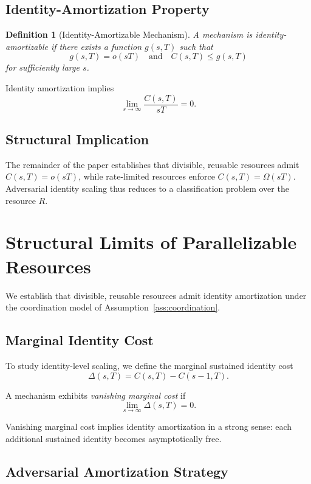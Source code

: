 \documentclass[journal]{IEEEtran}
\newtheorem{definition}{Definition}
\begin{document}
	
	\subsection{Identity-Amortization Property}
	
	\begin{definition}[Identity-Amortizable Mechanism]
		A mechanism is \emph{identity-amortizable} if there exists
		a function $g(s,T)$ such that
		\[
		g(s,T) = o(sT)
		\quad \text{and} \quad
		C(s,T) \le g(s,T)
		\]
		for sufficiently large $s$.
	\end{definition}
	
	Identity amortization implies
	\[
	\lim_{s \to \infty}
	\frac{C(s,T)}{sT} = 0.
	\]
	
	\subsection{Structural Implication}
	
	The remainder of the paper establishes that divisible, reusable
	resources admit $C(s,T)=o(sT)$, while rate-limited resources
	enforce $C(s,T)=\Omega(sT)$.
	Adversarial identity scaling thus reduces to a classification
	problem over the resource $R$.
	
	
	
	\section{Structural Limits of Parallelizable Resources}
	
	We establish that divisible, reusable resources admit identity
	amortization under the coordination model of
	Assumption~\ref{ass:coordination}.
	
	\subsection{Marginal Identity Cost}
	
	To study identity-level scaling,
	we define the marginal sustained identity cost
	\[
	\Delta(s,T) = C(s,T) - C(s-1,T).
	\]
	
	A mechanism exhibits \emph{vanishing marginal cost} if
	\[
	\lim_{s \to \infty} \Delta(s,T) = 0.
	\]
	
	Vanishing marginal cost implies identity amortization
	in a strong sense: each additional sustained identity
	becomes asymptotically free.
	
	\subsection{Adversarial Amortization Strategy}
	
\end{document}
